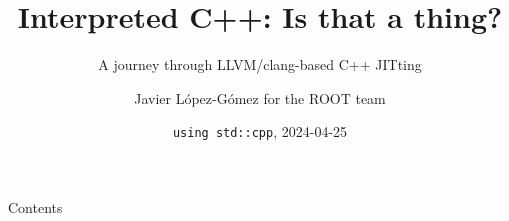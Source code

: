\documentclass[final,hyperref={pdfpagemode=FullScreen},aspectratio=169,10pt]{beamer}
\title{Interpreted C++: Is that a thing?}
\subtitle{A journey through LLVM/clang-based C++ JITting}
\author[Javier López-Gómez]{Javier López-Gómez for the ROOT team}
\date{\texttt{using std::cpp}, 2024-04-25}
\begin{document}
\maketitle


\begin{frame}{Contents}
  \tableofcontents[hidesubsections]
\end{frame}






\makeendpage

\appendix
\end{document}
